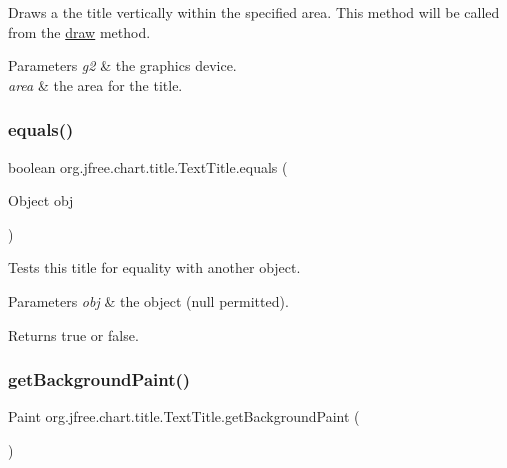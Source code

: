 Draws a the title vertically within the specified area. This method will be called from the \mbox{\hyperlink{classorg_1_1jfree_1_1chart_1_1title_1_1_text_title_a18f4f0fe150d298f6b85282690985a9d}{draw}} method.


\begin{DoxyParams}{Parameters}
{\em g2} & the graphics device. \\
\hline
{\em area} & the area for the title. \\
\hline
\end{DoxyParams}
\mbox{\label{classorg_1_1jfree_1_1chart_1_1title_1_1_text_title_ab9dabe6a6a1b0b5c72101bfa48337791}} 
\subsubsection{\texorpdfstring{equals()}{equals()}}
{\footnotesize\ttfamily boolean org.\+jfree.\+chart.\+title.\+Text\+Title.\+equals (\begin{DoxyParamCaption}\item[{Object}]{obj }\end{DoxyParamCaption})}

Tests this title for equality with another object.


\begin{DoxyParams}{Parameters}
{\em obj} & the object ({\ttfamily null} permitted).\\
\hline
\end{DoxyParams}
\begin{DoxyReturn}{Returns}
{\ttfamily true} or {\ttfamily false}. 
\end{DoxyReturn}
\mbox{\label{classorg_1_1jfree_1_1chart_1_1title_1_1_text_title_a54a237d1222f43625c44f15cb7d2d713}} 
\subsubsection{\texorpdfstring{get\+Background\+Paint()}{getBackgroundPaint()}}
{\footnotesize\ttfamily Paint org.\+jfree.\+chart.\+title.\+Text\+Title.\+get\+Background\+Paint (\begin{DoxyParamCaption}{ }\end{DoxyParamCaption})}


